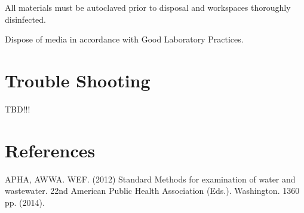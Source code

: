 \documentclass[12pt]{../SOP4_alpha}\usepackage[]{graphicx}\usepackage[]{xcolor}
\begin{document}
\NP All materials must be autoclaved prior to disposal and workspaces
thoroughly disinfected.

\NP Dispose of media in accordance with Good Laboratory Practices.

\section{Trouble Shooting}

TBD!!! 


\section{References}

\NP APHA, AWWA. WEF. (2012) Standard Methods for examination of water and wastewater. 22nd American Public Health Association (Eds.). Washington. 1360 pp. (2014).

\appendix



\end{document}
